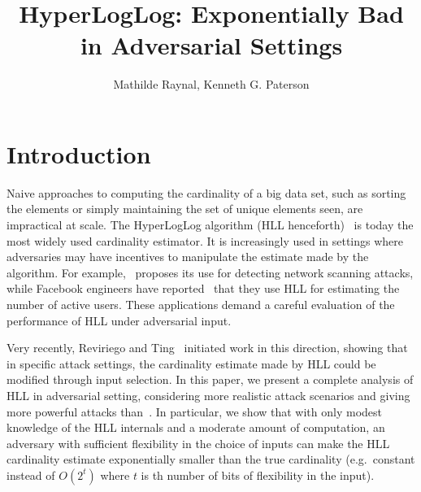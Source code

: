 \documentclass{IEEEtran}
\title{HyperLogLog: Exponentially Bad in Adversarial Settings}
\author{Mathilde Raynal, Kenneth G. Paterson}
\begin{document}
\maketitle


\IEEEdisplaynontitleabstractindextext

\section{Introduction}
Naive approaches to computing the cardinality of a big data set, such as sorting the elements or simply maintaining the set of unique elements seen, are impractical at scale. The HyperLogLog algorithm (HLL henceforth)~\cite{hll} is today the most widely used cardinality estimator. It is increasingly used in settings where adversaries may have  incentives to manipulate the estimate made by the algorithm. For example,~\cite{portscanhll} proposes its use for detecting network scanning attacks, while Facebook engineers have reported~\cite{fbhll} that they use HLL for estimating the number of active users. These applications demand a careful evaluation of the performance of HLL under adversarial input.

Very recently, Reviriego and Ting~\cite{hllvuln} initiated work in this direction, showing that in specific attack settings, the cardinality estimate made by HLL could be modified through input selection. In this paper, we present a complete analysis of HLL in adversarial setting, considering more realistic attack scenarios and giving more powerful attacks than~\cite{hllvuln}. In particular, we show that with only modest knowledge of the HLL internals and a moderate amount of computation, an adversary with sufficient flexibility in the choice of inputs can make the HLL cardinality estimate exponentially smaller than the true cardinality (e.g.\ constant instead of $O(2^t)$ where $t$ is th number of bits of flexibility in the input).
\end{document}
